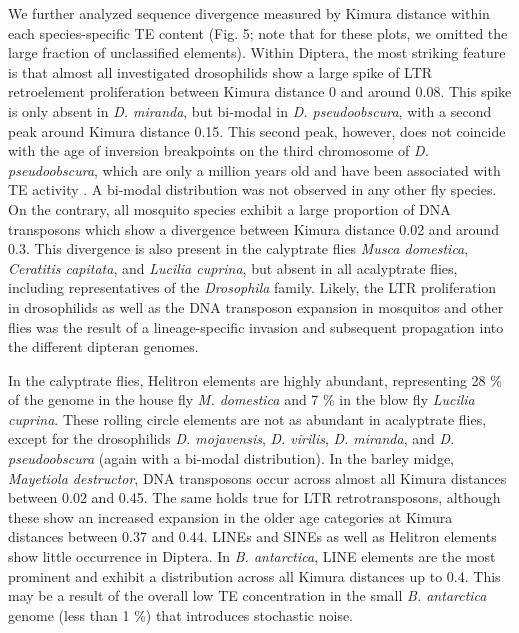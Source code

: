 We further analyzed sequence divergence measured by Kimura distance
within each species-specific TE content (Fig. 5; note that for these
plots, we omitted the large fraction of unclassified elements). Within
Diptera, the most striking feature is that almost all investigated
drosophilids show a large spike of LTR retroelement proliferation
between Kimura distance 0 and around 0.08. This spike is only absent in
\emph{D. miranda}, but bi-modal in \emph{D. pseudoobscura}, with a
second peak around Kimura distance 0.15. This second peak, however, does
not coincide with the age of inversion breakpoints on the third
chromosome of \emph{D. pseudoobscura}, which are only a million years
old and have been associated with TE activity \citep{Wallace2011}. A
bi-modal distribution was not observed in any other fly species. On the
contrary, all mosquito species exhibit a large proportion of DNA
transposons which show a divergence between Kimura distance 0.02 and
around 0.3. This divergence is also present in the calyptrate flies
\emph{Musca domestica}, \emph{Ceratitis capitata}, and \emph{Lucilia
cuprina}, but absent in all acalyptrate flies, including representatives
of the \emph{Drosophila} family. Likely, the LTR proliferation in
drosophilids as well as the DNA transposon expansion in mosquitos and
other flies was the result of a lineage-specific invasion and subsequent
propagation into the different dipteran genomes.



In the calyptrate flies, Helitron elements are highly abundant,
representing 28 \% of the genome in the house fly \emph{M. domestica}
and 7 \% in the blow fly \emph{Lucilia cuprina}. These rolling circle
elements are not as abundant in acalyptrate flies, except for the
drosophilids \emph{D. mojavensis}, \emph{D. virilis}, \emph{D. miranda},
and \emph{D. pseudoobscura} (again with a bi-modal distribution). In the
barley midge, \emph{Mayetiola destructor}, DNA transposons occur across
almost all Kimura distances between 0.02 and 0.45. The same holds true
for LTR retrotransposons, although these show an increased expansion in
the older age categories at Kimura distances between 0.37 and 0.44.
LINEs and SINEs as well as Helitron elements show little occurrence in
Diptera. In \emph{B. antarctica}, LINE elements are the most prominent
and exhibit a distribution across all Kimura distances up to 0.4. This
may be a result of the overall low TE concentration in the small
\emph{B. antarctica} genome (less than 1 \%) that introduces stochastic
noise.

